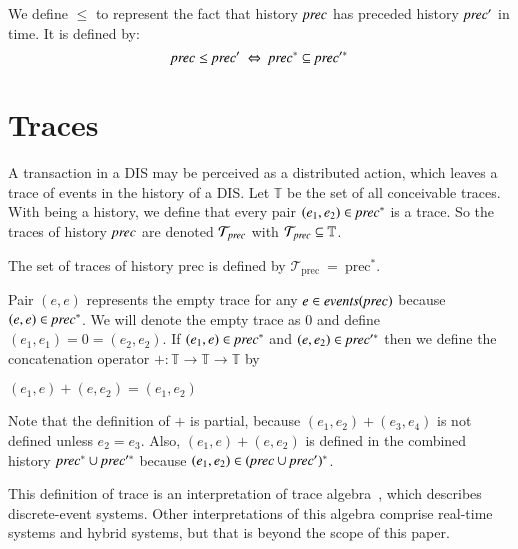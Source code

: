 \documentclass{elsarticle}
\def\id#1{\text{\em #1\/}}
\begin{document}
	We define $\leq$ to represent the fact that history $\id{prec}$ has preceded history $\id{prec}'$ in time.
	It is defined by:
\begin{equation}
\label{def:lies in the past}
	\id{prec}\leq\id{prec}'\ \Leftrightarrow\ \id{prec}^*\subseteq\id{prec}'^*
\end{equation}

\section{Traces}
\label{sct:Traces}
	A transaction in a DIS may be perceived as a distributed action,
	which leaves a trace of events in the history of a DIS.
	Let $\mathbb T$ be the set of all conceivable traces.
	With \id{prec} being a history, we define that every pair $(e_1,e_2)\in\id{prec}^*$ is a trace.
	So the traces of history $\id{prec}$ are denoted ${\mathcal T}_{\id{prec}}$ with ${\mathcal T}_{\id{prec}}\subseteq\mathbb T$.
\begin{definition}[Traces]
\label{def:Traces}
\item   The set of traces of history $\text{prec}$ is defined by ${\mathcal T}_{\text{prec}}\ =\ \text{prec}^*$.
\end{definition}
	Pair $(e,e)$ represents the empty trace for any $e\in\id{events}(\id{prec})$ because $(e,e)\in\id{prec}^*$.
	We will denote the empty trace as $0$ and define $(e_1,e_1)=0=(e_2,e_2)$.
	If $(e_1,e)\in\id{prec}^*$ and $(e,e_2)\in\id{prec}'^*$ then
	we define the concatenation operator $+:\mathbb T\rightarrow\mathbb T\rightarrow\mathbb T$ by
\begin{definition}
\label{def:concatenation}
\item   $(e_1,e)+(e,e_2)=(e_1,e_2)$
\end{definition}
	Note that the definition of $+$ is partial, because $(e_1,e_2)+(e_3,e_4)$ is not defined unless $e_2=e_3$.
	Also, $(e_1,e)+(e,e_2)$ is defined in the combined history $\id{prec}^*\cup\id{prec}'^*$
	because $(e_1,e_2)\in(\id{prec}\cup\id{prec}')^*$.

	This definition of trace is an interpretation of trace algebra~\cite{Foster17b}, which describes discrete-event systems.
	Other interpretations of this algebra comprise real-time systems and hybrid systems, but that is beyond the scope of this paper.
\end{document}
